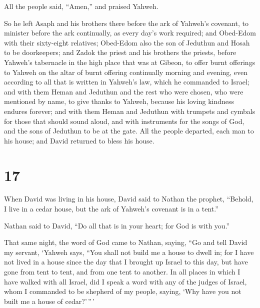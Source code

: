 All the people said, ``Amen,'' and praised Yahweh.

 So he left Asaph and his brothers there before the ark of
Yahweh's covenant, to minister before the ark continually, as every
day's work required;  and Obed-Edom with their sixty-eight
relatives; Obed-Edom also the son of Jeduthun and Hosah to be
doorkeepers;  and Zadok the priest and his brothers the
priests, before Yahweh's tabernacle in the high place that was at
Gibeon,  to offer burnt offerings to Yahweh on the altar of
burnt offering continually morning and evening, even according to all
that is written in Yahweh's law, which he commanded to Israel;
 and with them Heman and Jeduthun and the rest who were
chosen, who were mentioned by name, to give thanks to Yahweh, because
his loving kindness endures forever;  and with them Heman
and Jeduthun with trumpets and cymbals for those that should sound
aloud, and with instruments for the songs of God, and the sons of
Jeduthun to be at the gate.  All the people departed, each
man to his house; and David returned to bless his house.

\hypertarget{section-16}{%
\section{17}\label{section-16}}

 When David was living in his house, David said to Nathan
the prophet, ``Behold, I live in a cedar house, but the ark of Yahweh's
covenant is in a tent.''

 Nathan said to David, ``Do all that is in your heart; for
God is with you.''

 That same night, the word of God came to Nathan, saying,
 ``Go and tell David my servant, `Yahweh says, ``You shall
not build me a house to dwell in;  for I have not lived in a
house since the day that I brought up Israel to this day, but have gone
from tent to tent, and from one tent to another.  In all
places in which I have walked with all Israel, did I speak a word with
any of the judges of Israel, whom I commanded to be shepherd of my
people, saying, `Why have you not built me a house of cedar?'\,''\,'

